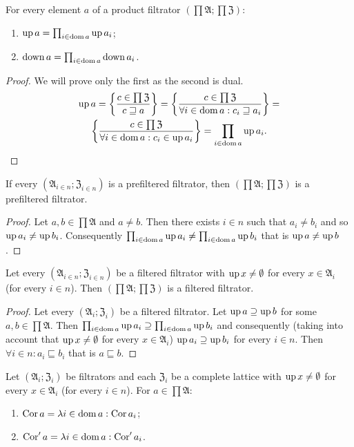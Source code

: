 \begin{prop}
For every element $a$ of a product filtrator $\left(\prod\mathfrak{A};\prod\mathfrak{Z}\right)$:
\begin{enumerate}
\item $\operatorname{up} a=\prod_{i\in\operatorname{dom} a}\operatorname{up} a_{i}$;
\item $\operatorname{down} a=\prod_{i\in\operatorname{dom} a}\operatorname{down} a_{i}$.
\end{enumerate}
\end{prop}
\begin{proof}
We will prove only the first as the second is dual.
\begin{multline*}
\operatorname{up} a=\left\{ \frac{c\in\prod\mathfrak{Z}}{c\sqsupseteq a}\right\}=\left\{ \frac{c\in\prod\mathfrak{Z}}{\forall i\in\operatorname{dom} a:c_{i}\sqsupseteq a_{i}}\right\}=\\
\left\{ \frac{c\in\prod\mathfrak{Z}}{\forall i\in\operatorname{dom} a:c_{i}\in\operatorname{up} a_{i}}\right\}=\prod_{i\in\operatorname{dom} a}\operatorname{up} a_{i}.
\end{multline*}
\end{proof}
\begin{prop}
If every $(\mathfrak{A}_{i\in n};\mathfrak{Z}_{i\in n})$ is a prefiltered
filtrator, then $\left(\prod\mathfrak{A};\prod\mathfrak{Z}\right)$
is a prefiltered filtrator.\end{prop}
\begin{proof}
Let $a,b\in\prod\mathfrak{A}$ and $a\neq b$. Then there exists $i\in n$
such that $a_{i}\neq b_{i}$ and so $\operatorname{up} a_{i}\neq\operatorname{up} b_{i}$. Consequently
$\prod_{i\in\operatorname{dom} a}\operatorname{up} a_{i}\neq\prod_{i\in\operatorname{dom} a}\operatorname{up} b_{i}$
that is $\operatorname{up} a\neq\operatorname{up} b$.\end{proof}
\begin{prop}
Let every $(\mathfrak{A}_{i\in n};\mathfrak{Z}_{i\in n})$ be a filtered
filtrator with $\operatorname{up} x\neq\emptyset$ for every $x\in\mathfrak{A}_{i}$
(for every $i\in n$). Then $\left(\prod\mathfrak{A};\prod\mathfrak{Z}\right)$
is a filtered filtrator.\end{prop}
\begin{proof}
Let every $(\mathfrak{A}_{i};\mathfrak{Z}_{i})$ be a filtered filtrator.
Let $\operatorname{up} a\supseteq\operatorname{up} b$ for some $a,b\in\prod\mathfrak{A}$. Then
$\prod_{i\in\operatorname{dom} a}\operatorname{up} a_{i}\supseteq\prod_{i\in\operatorname{dom} a}\operatorname{up} b_{i}$
and consequently (taking into account that $\operatorname{up} x\neq\emptyset$ for
every $x\in\mathfrak{A}_{i}$) $\operatorname{up} a_{i}\supseteq\operatorname{up} b_{i}$ for
every $i\in n$. Then $\forall i\in n:a_{i}\sqsubseteq b_{i}$ that
is $a\sqsubseteq b$.\end{proof}
\begin{prop}
Let $(\mathfrak{A}_{i};\mathfrak{Z}_{i})$ be filtrators and each
$\mathfrak{Z}_{i}$ be a complete lattice with $\operatorname{up} x\neq\emptyset$
for every $x\in\mathfrak{A}_{i}$ (for every $i\in n$). For $a\in\prod\mathfrak{A}$:
\begin{enumerate}
\item $\operatorname{Cor} a=\lambda i\in\operatorname{dom} a:\operatorname{Cor} a_{i}$;
\item $\operatorname{Cor}'a=\lambda i\in\operatorname{dom} a:\operatorname{Cor}'a_{i}$.
\end{enumerate}
\end{prop}
